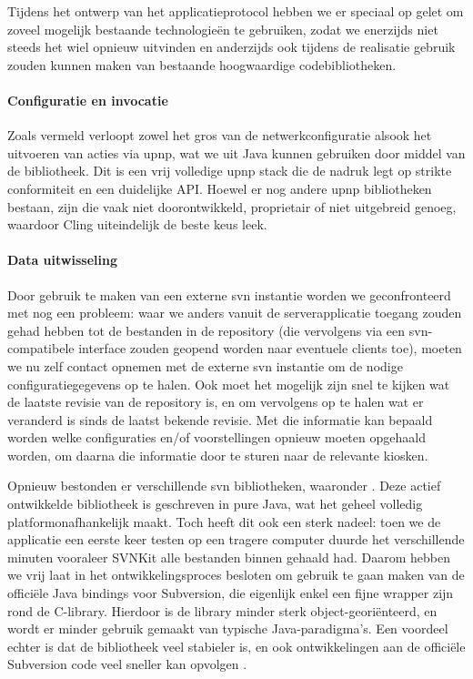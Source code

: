 Tijdens het ontwerp van het applicatieprotocol hebben we er speciaal op gelet om zoveel mogelijk bestaande technologieën te gebruiken, zodat we enerzijds niet steeds het wiel opnieuw uitvinden en anderzijds ook tijdens de realisatie gebruik zouden kunnen maken van bestaande hoogwaardige codebibliotheken.

\paragraph{Configuratie en invocatie} Zoals vermeld verloopt zowel het gros van de netwerkconfiguratie alsook het uitvoeren van acties via \ac{upnp}, wat we uit Java kunnen gebruiken door middel van de  bibliotheek. Dit is een vrij volledige \ac{upnp} stack die de nadruk legt op strikte conformiteit en een duidelijke API. Hoewel er nog andere \ac{upnp} bibliotheken bestaan, zijn die vaak niet doorontwikkeld, proprietair of niet uitgebreid genoeg, waardoor Cling uiteindelijk de beste keus leek.

\paragraph{Data uitwisseling} Door gebruik te maken van een externe \ac{svn} instantie worden we geconfronteerd met nog een probleem: waar we anders vanuit de serverapplicatie toegang zouden gehad hebben tot de bestanden in de repository (die vervolgens via een \ac{svn}-compatibele interface zouden geopend worden naar eventuele clients toe), moeten we nu zelf contact opnemen met de externe \ac{svn} instantie om de nodige configuratiegegevens op te halen. Ook moet het mogelijk zijn snel te kijken wat de laatste revisie van de repository is, en om vervolgens op te halen wat er veranderd is sinds de laatst bekende revisie. Met die informatie kan bepaald worden welke configuraties en/of voorstellingen opnieuw moeten opgehaald worden, om daarna die informatie door te sturen naar de relevante kiosken.

Opnieuw bestonden er verschillende \ac{svn} bibliotheken, waaronder . Deze actief ontwikkelde bibliotheek is geschreven in pure Java, wat het geheel volledig platformonafhankelijk maakt. Toch heeft dit ook een sterk nadeel: toen we de applicatie een eerste keer testen op een tragere computer duurde het verschillende minuten vooraleer SVNKit alle bestanden binnen gehaald had. Daarom hebben we vrij laat in het ontwikkelingsproces besloten om gebruik te gaan maken van de officiële Java bindings voor Subversion, die eigenlijk enkel een fijne wrapper zijn rond de C-library. Hierdoor is de library minder sterk object-georiënteerd, en wordt er minder gebruik gemaakt van typische Java-paradigma's. Een voordeel echter is dat de bibliotheek veel stabieler is, en ook ontwikkelingen aan de officiële Subversion code veel sneller kan opvolgen \citep{svn:javahl}.

